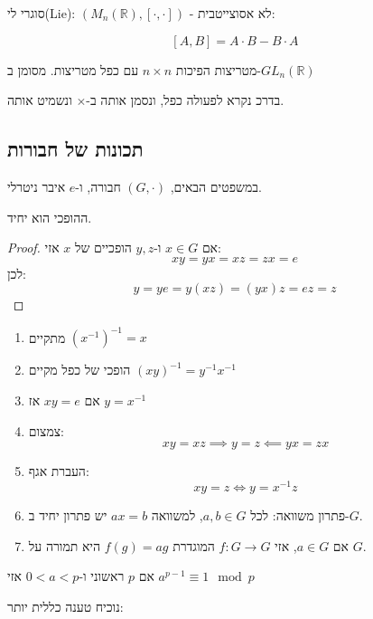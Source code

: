 \documentclass{tstextbook}
\begin{document}
\begin{example}
סוגרי לי(Lie): \((M_{n}(\mathbb{R}),[\cdot,\cdot])\) - לא אסוצייטבית:

$$[A,B]=A\cdot B-B\cdot A$$

\end{example}
\begin{example}
מטריצות הפיכות \(n\times n\) עם כפל מטריצות. מסומן ב-\(GL_{n}(\mathbb{R})\)

\end{example}
\begin{remark}
בדרכ נקרא לפעולה כפל, ונסמן אותה ב-\(\times\) ונשמיט אותה. 

\end{remark}
\subsection{תכונות של חבורות}

במשפטים הבאים, \((G,\cdot)\) חבורה, ו-\(e\) איבר ניטרלי.

\begin{proposition}
ההופכי הוא יחיד.

\end{proposition}
\begin{proof}
אם \(x \in G\) ו-\(y,z\) הופכיים של \(x\) אזי:
$$xy=yx=xz=zx=e$$
לכן:
$$y=ye=y(xz)=(yx)z=ez=z$$

\end{proof}
\begin{proposition}
  \begin{enumerate}
    \item מתקיים \((x^{-1})^{-1}=x\)


    \item הופכי של כפל מקיים \((xy)^{-1}=y^{-1}x ^{-1}\)


    \item אם \(xy=e\) אז \(y=x ^{-1}\)


    \item צמצום:\\
$$xy=xz\implies y=z \impliedby yx=zx$$


    \item העברת אגף:\\
$$xy=z\iff y=x ^{-1}z$$


    \item פתרון משוואה: לכל \(a,b\in G\), למשוואה \(ax=b\) יש פתרון יחיד ב-\(G\). 


    \item אם \(a\in G\), אזי \(f:G\to G\) המוגדרת \(f(g)=ag\) היא תמורה על \(G\). 


  \end{enumerate}
\end{proposition}
\begin{theorem}[פרמה]
אם \(p\) ראשוני ו-\(0<a <p\) אזי \(a^{p-1}\equiv 1\mod p\)

\end{theorem}
נוכיח טענה כללית יותר:
\end{document}
